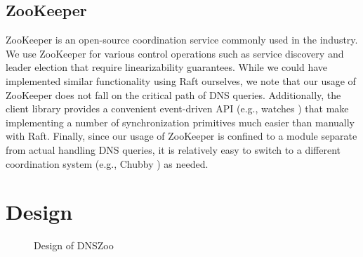 \documentclass[format=sigconf,nonacm,screen]{acmart}
\newcommand{\dnszoo}{\textsf{DNSZoo}}
\begin{document}
\subsection{ZooKeeper}
ZooKeeper \cite{2010zookeeper} is an open-source coordination service commonly used in the industry. We use ZooKeeper for various control operations such as service discovery and leader election that require linearizability guarantees.
While we could have implemented similar functionality using Raft ourselves, we note that our usage of ZooKeeper does not fall on the critical path of DNS queries. Additionally, the client library provides a convenient event-driven API (e.g., watches \cite{2010zookeeper}) that make implementing a number of synchronization primitives much easier than manually with Raft. Finally, since our usage of ZooKeeper is confined to a module separate from actual handling DNS queries, it is relatively easy to switch to a different coordination system (e.g., Chubby \cite{2006chubby}) as needed.

\section{Design}

\begin{figure}[t]
\vspace*{-\baselineskip}
\centering
    \hspace{2em}
    \caption{Design of \dnszoo{}}
\vspace*{-\baselineskip}
\end{figure}
\end{document}
